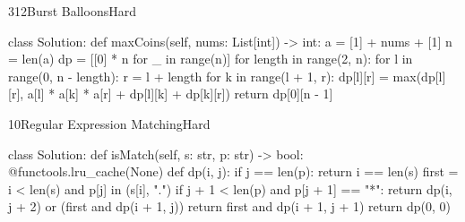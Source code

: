 \begin{problem}{312}{Burst Balloons}{Hard}
\begin{code}
class Solution:
    def maxCoins(self, nums: List[int]) -> int:
        a = [1] + nums + [1]
        n = len(a)
        dp = [[0] * n for _ in range(n)]
        for length in range(2, n):
            for l in range(0, n - length):
                r = l + length
                for k in range(l + 1, r):
                    dp[l][r] = max(dp[l][r], a[l] * a[k] * a[r] + dp[l][k] + dp[k][r])
        return dp[0][n - 1]
\end{code}
\end{problem}

\begin{problem}{10}{Regular Expression Matching}{Hard}
\begin{code}
class Solution:
    def isMatch(self, s: str, p: str) -> bool:
        @functools.lru_cache(None)
        def dp(i, j):
            if j == len(p):
                return i == len(s)
            first = i < len(s) and p[j] in (s[i], ".")
            if j + 1 < len(p) and p[j + 1] == "*":
                return dp(i, j + 2) or (first and dp(i + 1, j))
            return first and dp(i + 1, j + 1)
        return dp(0, 0)
\end{code}
\end{problem}

